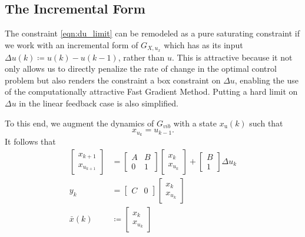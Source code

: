 \documentclass[journal,twocolumn,twoside]{IEEEtran}
\newcommand{\xd}{\ensuremath{\bar x }\xspace}
\newcommand{\x}{\ensuremath{x }\xspace}
\newcommand{\y}{\ensuremath{y} \xspace}
\begin{document}
\subsection{The Incremental Form}\label{sec:incremental}
The constraint \eqref{eqn:du_limit} can be remodeled as a pure saturating constraint if we work with an incremental form of \(G_{X,u_x}\) which has as its input \({\Delta u(k)\coloneqq u(k)-u(k-1)}\), rather than \(u\). This is attractive because it not only allows us to directly penalize the rate of change in the optimal control problem but also renders the constraint a box constraint on $\Delta u$, enabling the use of the computationally attractive Fast Gradient Method. Putting a hard limit on $\Delta u$ in the linear feedback case is also simplified.

To this end, we augment the dynamics of \(G_{vib}\) with a state \(\x_{\text{u}}(k)\) such that
\begin{equation*}
  \x_{u_k} = u_{k-1}.
\end{equation*}
It follows that
\begin{subequations}
\begin{align}
  \begin{bmatrix}\x_{k+1}\\\x_{u_{k+1}}\end{bmatrix}
  &=
    \begin{bmatrix}
      A & B\\ 0 & 1
    \end{bmatrix}
    \begin{bmatrix}\x_k\\\x_{u_k}\end{bmatrix}
    +
    \begin{bmatrix}
      B\\1
    \end{bmatrix}
  \Delta u_k \label{eqn:deltadyn} \\
  \y_k & = \begin{bmatrix}C & 0\end{bmatrix}\begin{bmatrix}\x_k\\\x_{u_k}\end{bmatrix}\\
    \xd(k)& \coloneqq
    \begin{bmatrix}\x_k\\\x_{u_k} \end{bmatrix}
\end{align}\label{eqn:ssdelta}%
\end{subequations}
\end{document}
